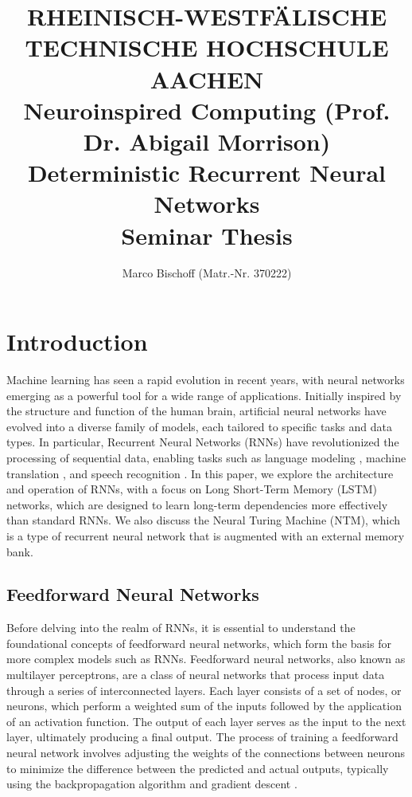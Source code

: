 \documentclass{article}
\title{
  {\bf \scriptsize
    RHEINISCH-WESTF\"ALISCHE TECHNISCHE HOCHSCHULE AACHEN \\
    Neuroinspired Computing (Prof. Dr. Abigail Morrison)
  } \vspace{2cm} \\
  Deterministic Recurrent Neural Networks \\
  {\large Seminar Thesis} 
}
\author{Marco Bischoff (Matr.-Nr. 370222)}
\begin{document}
\pagestyle{headings}

\maketitle
\newpage

\tableofcontents
\newpage



\section{Introduction}
\label{ch:1}

Machine learning has seen a rapid evolution in recent years, with neural networks emerging
as a powerful tool for a wide range of applications. Initially inspired by the structure
and function of the human brain, artificial neural networks have evolved into a diverse
family of models, each tailored to specific tasks and data types. In particular, Recurrent
Neural Networks (RNNs) have revolutionized the processing of sequential data, enabling
tasks such as language modeling \cite{merity2017regularizing}, machine translation
\cite{choLearningPhraseRepresentations2014}, and speech recognition
\cite{graves2013speech}. In this paper, we explore the architecture and operation of RNNs,
with a focus on Long Short-Term Memory (LSTM) networks, which are designed to learn
long-term dependencies more effectively than standard RNNs. We also discuss the Neural
Turing Machine (NTM), which is a type of recurrent neural network that is augmented with
an external memory bank.


\subsection{Feedforward Neural Networks}
\label{sec:1.0}

Before delving into the realm of RNNs, it is essential to understand the foundational
concepts of feedforward neural networks, which form the basis for more complex models such
as RNNs. Feedforward neural networks, also known as multilayer perceptrons, are a class of
neural networks that process input data through a series of interconnected layers. Each
layer consists of a set of nodes, or neurons, which perform a weighted sum of the inputs
followed by the application of an activation function. The output of each layer serves as
the input to the next layer, ultimately producing a final output. The process of training
a feedforward neural network involves adjusting the weights of the connections between
neurons to minimize the difference between the predicted and actual outputs, typically
using the backpropagation algorithm and gradient descent \cite{mitchell_machine_1997}.
\end{document}
